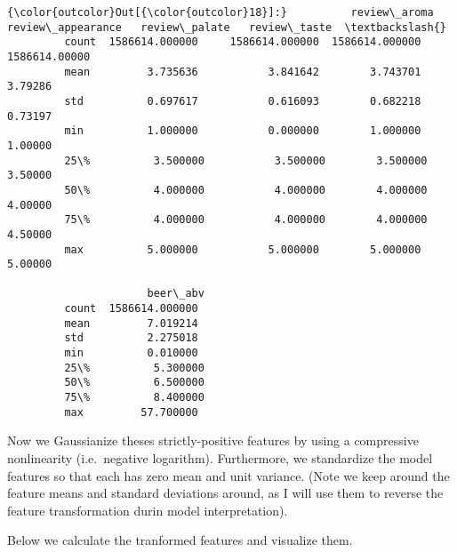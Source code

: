 \documentclass{article}
\begin{document}
            \begin{Verbatim}[commandchars=\\\{\}]
{\color{outcolor}Out[{\color{outcolor}18}]:}          review\_aroma  review\_appearance   review\_palate   review\_taste  \textbackslash{}
         count  1586614.000000     1586614.000000  1586614.000000  1586614.00000   
         mean         3.735636           3.841642        3.743701        3.79286   
         std          0.697617           0.616093        0.682218        0.73197   
         min          1.000000           0.000000        1.000000        1.00000   
         25\%          3.500000           3.500000        3.500000        3.50000   
         50\%          4.000000           4.000000        4.000000        4.00000   
         75\%          4.000000           4.000000        4.000000        4.50000   
         max          5.000000           5.000000        5.000000        5.00000   
         
                      beer\_abv  
         count  1586614.000000  
         mean         7.019214  
         std          2.275018  
         min          0.010000  
         25\%          5.300000  
         50\%          6.500000  
         75\%          8.400000  
         max         57.700000  
\end{Verbatim}
        
    Now we Gaussianize theses strictly-positive features by using a
compressive nonlinearity (i.e.~negative logarithm). Furthermore, we
standardize the model features so that each has zero mean and unit
variance. (Note we keep around the feature means and standard deviations
around, as I will use them to reverse the feature transformation durin
model interpretation).

Below we calculate the tranformed features and visualize them.
\end{document}
